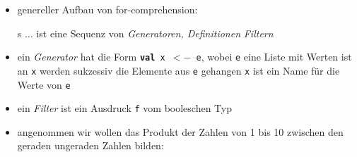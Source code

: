 \begin{itemize}
\begin{itemize}
    
    
    \item genereller Aufbau von for-comprehension:
    
    \begin{shadowminipage}
    
    \end{shadowminipage}
    
    
    s $\ldots$ ist eine Sequenz von \textit{Generatoren, Definitionen}
    \und \textit{Filtern}
    \item ein \textit{Generator} hat die Form 
    \texttt{\textbf{val} x $<-$ e}, wobei
    \texttt{e} eine Liste mit Werten ist \und an \texttt{x} 
    werden sukzessiv die Elemente aus \texttt{e} gehangen
    \texttt{x} ist ein Name für die Werte von \texttt{e}
    \item ein \textit{Filter} ist ein Ausdruck \texttt{f} vom 
    booleschen Typ
    \item angenommen wir wollen das Produkt der Zahlen von 1 bis 10
    zwischen den geraden \und ungeraden Zahlen bilden:
    
    
 
  \end{itemize}
\end{itemize}


